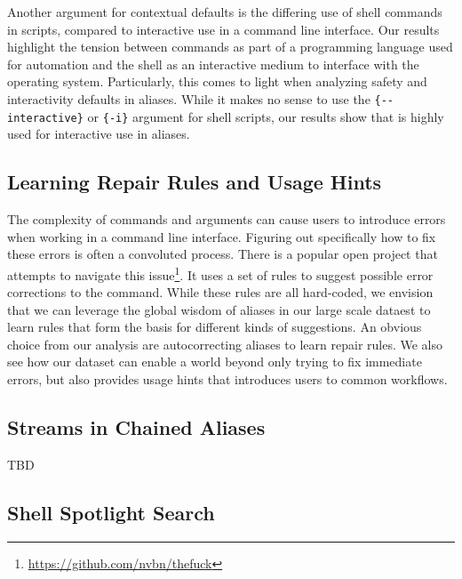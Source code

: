 Another argument for contextual defaults is the differing use of shell commands in scripts, compared to interactive use in a command line interface.
Our results highlight the tension between commands as part of a programming language used for automation and the shell as an interactive medium to interface with the operating system.
Particularly, this comes to light when analyzing safety and interactivity defaults in aliases.
While it makes no sense to use the \verb|{--interactive}| or \verb|{-i}| argument for shell scripts, our results show that is highly used for interactive use in aliases.

\subsection{Learning Repair Rules and Usage Hints}

The complexity of commands and arguments can cause users to introduce errors when working in a command line interface.
Figuring out specifically how to fix these errors is often a convoluted process.
There is a popular open project that attempts to navigate this issue\footnote{\url{https://github.com/nvbn/thefuck}}.
It uses a set of rules to suggest possible error corrections to the command.
While these rules are all hard-coded, we envision that we can leverage the global wisdom of aliases in our large scale dataest to learn rules that form the basis for different kinds of suggestions.
An obvious choice from our analysis are autocorrecting aliases to learn repair rules.
We also see how our dataset can enable a world beyond only trying to fix immediate errors, but also provides usage hints that introduces users to common workflows.

\subsection{Streams in Chained Aliases}

TBD



\subsection{Shell Spotlight Search}


